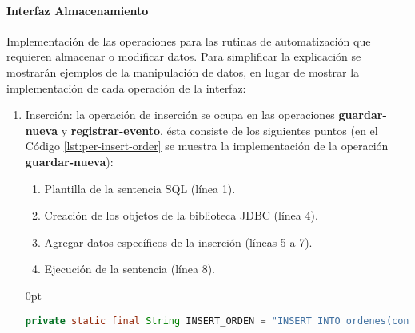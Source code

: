 \paragraph{\indent Interfaz Almacenamiento\\}
Implementación de las operaciones para las rutinas de automatización que requieren almacenar o modificar datos. Para simplificar la explicación se mostrarán ejemplos de la manipulación de datos, en lugar de mostrar la implementación de cada operación de la interfaz:
\begin{enumerate}
	\item Inserción: la operación de inserción se ocupa en las operaciones \textbf{guardar-nueva} y \textbf{registrar-evento}, ésta consiste de los siguientes puntos (en el Código \ref{lst:per-insert-order} se muestra la implementación de la operación \textbf{guardar-nueva}):
	\begin{enumerate}
		\item Plantilla de la sentencia SQL (línea 1).
		\item Creación de los objetos de la biblioteca JDBC (línea 4).
		\item Agregar datos específicos de la inserción (líneas 5 a 7).
		\item Ejecución de la sentencia (línea 8).
	\end{enumerate}
	\begin{adjustwidth}{\listingfixwidth}{0pt}
	\begin{lstlisting}[language=Java, caption={Inserción de una nueva orden de reposición en la base de datos.}, captionpos=b, label={lst:per-insert-order}]
private static final String INSERT_ORDEN = "INSERT INTO ordenes(contrato, solicitud, orden, fecha_expedicion, almacen_destino, url_con, url_env, estatus, id_sesion_insersion, id_sesion_estatus, fecha_estatus) VALUES(?, ?, ?, ?, ?, ?, ?, 1, ?, ?, CURRENT_TIMESTAMP)";


\end{lstlisting}
\end{adjustwidth}
\end{enumerate}
